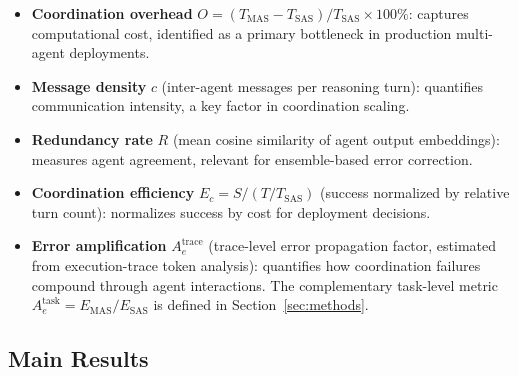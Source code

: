 \begin{itemize}[leftmargin=1.5em, topsep=2pt, itemsep=1pt]

\item \textbf{Coordination overhead} $O = (T_{\text{MAS}} - T_{\text{SAS}})/T_{\text{SAS}} \times 100\%$: captures computational cost, identified as a primary bottleneck in production multi-agent deployments.

\item \textbf{Message density} $c$ (inter-agent messages per reasoning turn): quantifies communication intensity, a key factor in coordination scaling.

\item \textbf{Redundancy rate} $R$ (mean cosine similarity of agent output embeddings): measures agent agreement, relevant for ensemble-based error correction.

\item \textbf{Coordination efficiency} $E_c = S/(T/T_{\text{SAS}})$ (success normalized by relative turn count): normalizes success by cost for deployment decisions.


\item \textbf{Error amplification} $A_e^{\text{trace}}$ (trace-level error propagation factor, estimated from execution-trace token analysis): quantifies how coordination failures compound through agent interactions. The complementary task-level metric $A_e^{\text{task}} = E_{\text{MAS}}/E_{\text{SAS}}$ is defined in Section~\ref{sec:methods}.
\end{itemize}
  
\subsection{Main Results}
\label{subsec:main_results}
  
